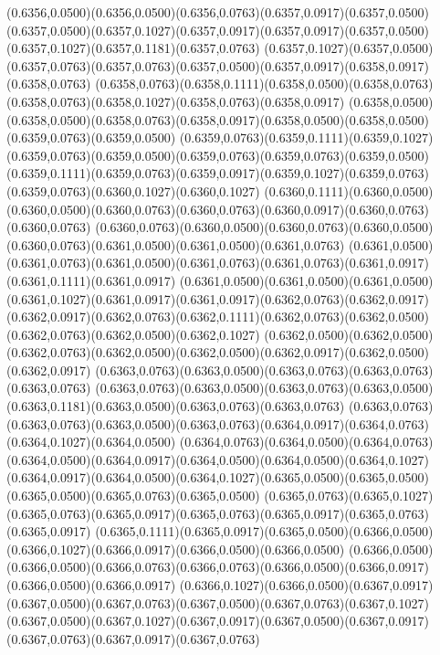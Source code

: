 (0.6356,0.0500)(0.6356,0.0500)(0.6356,0.0763)(0.6357,0.0917)(0.6357,0.0500)
\PST@Solid(0.6357,0.0500)(0.6357,0.1027)(0.6357,0.0917)(0.6357,0.0917)(0.6357,0.0500)(0.6357,0.1027)(0.6357,0.1181)(0.6357,0.0763)
(0.6357,0.1027)(0.6357,0.0500)(0.6357,0.0763)(0.6357,0.0763)(0.6357,0.0500)(0.6357,0.0917)(0.6358,0.0917)(0.6358,0.0763)
(0.6358,0.0763)(0.6358,0.1111)(0.6358,0.0500)(0.6358,0.0763)(0.6358,0.0763)(0.6358,0.1027)(0.6358,0.0763)(0.6358,0.0917)
(0.6358,0.0500)(0.6358,0.0500)(0.6358,0.0763)(0.6358,0.0917)(0.6358,0.0500)(0.6358,0.0500)(0.6359,0.0763)(0.6359,0.0500)
(0.6359,0.0763)(0.6359,0.1111)(0.6359,0.1027)(0.6359,0.0763)(0.6359,0.0500)(0.6359,0.0763)(0.6359,0.0763)(0.6359,0.0500)
(0.6359,0.1111)(0.6359,0.0763)(0.6359,0.0917)(0.6359,0.1027)(0.6359,0.0763)(0.6359,0.0763)(0.6360,0.1027)(0.6360,0.1027)
(0.6360,0.1111)(0.6360,0.0500)(0.6360,0.0500)(0.6360,0.0763)(0.6360,0.0763)(0.6360,0.0917)(0.6360,0.0763)(0.6360,0.0763)
(0.6360,0.0763)(0.6360,0.0500)(0.6360,0.0763)(0.6360,0.0500)(0.6360,0.0763)(0.6361,0.0500)(0.6361,0.0500)(0.6361,0.0763)
(0.6361,0.0500)(0.6361,0.0763)(0.6361,0.0500)(0.6361,0.0763)(0.6361,0.0763)(0.6361,0.0917)(0.6361,0.1111)(0.6361,0.0917)
(0.6361,0.0500)(0.6361,0.0500)(0.6361,0.0500)(0.6361,0.1027)(0.6361,0.0917)(0.6361,0.0917)(0.6362,0.0763)(0.6362,0.0917)
(0.6362,0.0917)(0.6362,0.0763)(0.6362,0.1111)(0.6362,0.0763)(0.6362,0.0500)(0.6362,0.0763)(0.6362,0.0500)(0.6362,0.1027)
(0.6362,0.0500)(0.6362,0.0500)(0.6362,0.0763)(0.6362,0.0500)(0.6362,0.0500)(0.6362,0.0917)(0.6362,0.0500)(0.6362,0.0917)
(0.6363,0.0763)(0.6363,0.0500)(0.6363,0.0763)(0.6363,0.0763)(0.6363,0.0763)
\PST@Solid(0.6363,0.0763)(0.6363,0.0500)(0.6363,0.0763)(0.6363,0.0500)(0.6363,0.1181)(0.6363,0.0500)(0.6363,0.0763)(0.6363,0.0763)
(0.6363,0.0763)(0.6363,0.0763)(0.6363,0.0500)(0.6363,0.0763)(0.6364,0.0917)(0.6364,0.0763)(0.6364,0.1027)(0.6364,0.0500)
(0.6364,0.0763)(0.6364,0.0500)(0.6364,0.0763)(0.6364,0.0500)(0.6364,0.0917)(0.6364,0.0500)(0.6364,0.0500)(0.6364,0.1027)
(0.6364,0.0917)(0.6364,0.0500)(0.6364,0.1027)(0.6365,0.0500)(0.6365,0.0500)(0.6365,0.0500)(0.6365,0.0763)(0.6365,0.0500)
(0.6365,0.0763)(0.6365,0.1027)(0.6365,0.0763)(0.6365,0.0917)(0.6365,0.0763)(0.6365,0.0917)(0.6365,0.0763)(0.6365,0.0917)
(0.6365,0.1111)(0.6365,0.0917)(0.6365,0.0500)(0.6366,0.0500)(0.6366,0.1027)(0.6366,0.0917)(0.6366,0.0500)(0.6366,0.0500)
(0.6366,0.0500)(0.6366,0.0500)(0.6366,0.0763)(0.6366,0.0763)(0.6366,0.0500)(0.6366,0.0917)(0.6366,0.0500)(0.6366,0.0917)
(0.6366,0.1027)(0.6366,0.0500)(0.6367,0.0917)(0.6367,0.0500)(0.6367,0.0763)(0.6367,0.0500)(0.6367,0.0763)(0.6367,0.1027)
(0.6367,0.0500)(0.6367,0.1027)(0.6367,0.0917)(0.6367,0.0500)(0.6367,0.0917)(0.6367,0.0763)(0.6367,0.0917)(0.6367,0.0763)
